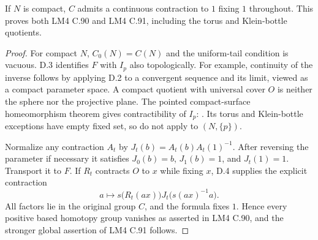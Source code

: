 If $N$ is compact, $C$ admits a continuous contraction to $1$ fixing
$1$ throughout.  This proves both LM4 C.90 and LM4 C.91, including
the torus and Klein-bottle quotients.
\begin{proof}
For compact $N$, $C_0(N)=C(N)$ and the uniform-tail condition is
vacuous.  D.3 identifies $F$ with $I_p$ also topologically.  For
example, continuity of the inverse follows by applying D.2 to a
convergent sequence and its limit, viewed as a compact parameter
space.  A compact quotient with universal cover $O$ is neither the
sphere nor the projective plane.  The pointed compact-surface
homeomorphism theorem gives contractibility of $I_p$:
\cite[Lemma 2.1(i), pp.~2--3]{DE_Yagasaki2000}.  Its torus and
Klein-bottle exceptions have empty fixed set, so do not apply to
$(N,\{p\})$.

Normalize any contraction $A_t$ by
$J_t(b)=A_t(b)A_t(1)^{-1}$.  After reversing the parameter if
necessary it satisfies $J_0(b)=b$, $J_1(b)=1$, and $J_t(1)=1$.
Transport it to $F$.  If $R_t$ contracts $O$ to $x$ while fixing
$x$, D.4 supplies the explicit contraction
\[
 a\longmapsto s\bigl(R_t(ax)\bigr)
 J_t\bigl(s(ax)^{-1}a\bigr).
\]
All factors lie in the original group $C$, and the formula fixes
$1$.  Hence every positive based homotopy group vanishes as asserted
in LM4 C.90, and the stronger global assertion of LM4 C.91 follows.
\end{proof}


